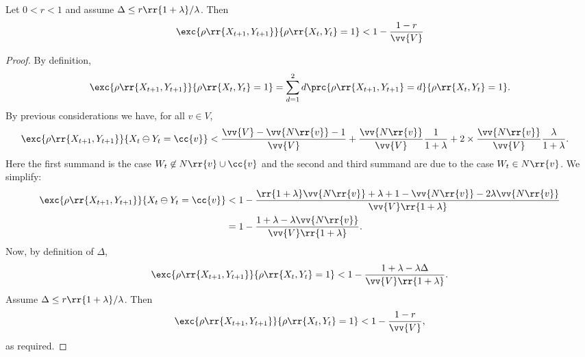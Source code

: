 \documentclass{article}
\begin{document}
\begin{claim*}[4]
  Let $0<r<1$ and assume $\Delta \leq r\rr{1+\lambda}/\lambda$. Then
  \begin{align*}
    \exc{\rho\rr{X_{t+1},Y_{t+1}}}{\rho\rr{X_t,Y_t}=1} < 1 - \frac{1-r}{\vv{V}}
  \end{align*}
  \begin{proof}
    By definition,
    \begin{align*}
      \exc{\rho\rr{X_{t+1},Y_{t+1}}}{\rho\rr{X_t,Y_t}=1} = \sum_{d=1}^{2} d\prc{\rho\rr{X_{t+1},Y_{t+1}}=d}{\rho\rr{X_t,Y_t}=1}.
    \end{align*}
    By previous considerations we have, for all $v\in V$,
    \begin{align*}
      \exc{\rho\rr{X_{t+1},Y_{t+1}}}{X_t\ominus Y_t=\cc{v}}
      &< \frac{\vv{V}-\vv{N\rr{v}}-1}{\vv{V}}
      + \frac{\vv{N\rr{v}}}{\vv{V}}\frac{1}{1+\lambda}
      + 2\times\frac{\vv{N\rr{v}}}{\vv{V}} \frac{\lambda}{1+\lambda}.
    \end{align*}
    Here the first summand is the case $W_t\not\in N\rr{v}\cup \cc{v}$ and the second and third summand are
    due to the case $W_t\in N\rr{v}$. We simplify:
    \begin{align*}
      \exc{\rho\rr{X_{t+1},Y_{t+1}}}{X_t\ominus Y_t=\cc{v}}
      &< 1 - \frac{\rr{1+\lambda}\vv{N\rr{v}}+\lambda + 1 - \vv{N\rr{v}}-2\lambda \vv{N\rr{v}}}{\vv{V}\rr{1+\lambda}}\\
      &= 1 - \frac{1+\lambda -\lambda \vv{N\rr{v}}}{\vv{V}\rr{1+\lambda}}.
    \end{align*}
    Now, by definition of $\Delta$,
    \begin{align*}
      \exc{\rho\rr{X_{t+1},Y_{t+1}}}{\rho\rr{X_t,Y_t}=1} < 1 - \frac{1+\lambda - \lambda\Delta}{\vv{V}\rr{1+\lambda}}.
    \end{align*}
    Assume $\Delta\leq r\rr{1+\lambda}/\lambda$. Then
    \begin{align*}
      \exc{\rho\rr{X_{t+1},Y_{t+1}}}{\rho\rr{X_t,Y_t}=1} < 1 - \frac{1-r}{\vv{V}},
    \end{align*}
    as required.
  \end{proof}
\end{claim*}
\end{document}
